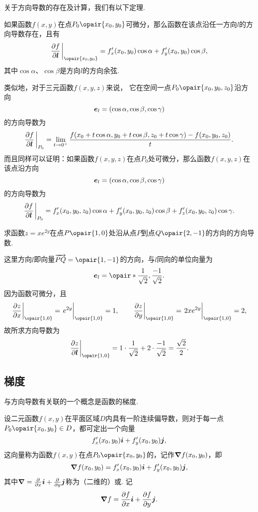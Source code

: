 关于方向导数的存在及计算，我们有以下定理.
\begin{theorem}[充分条件]
如果函数\(f(x,y)\)在点\(P_0\opair{x_0,y_0}\)可微分，那么函数在该点沿任一方向\(l\)的方向导数存在，且有\[
\pdv{f}{\mat{l}}\eval_{\opair{x_0,y_0}}
=f'_x(x_0,y_0) \cos\alpha + f'_y(x_0,y_0) \cos\beta,
\]其中\(\cos\alpha\)、\(\cos\beta\)是方向\(l\)的方向余弦.
\end{theorem}

类似地，对于三元函数\(f(x,y,z)\)来说，%
它在空间一点\(P_0\opair{x_0,y_0,z_0}\)沿方向\[
	\boldsymbol{e}_l = (\cos\alpha,\cos\beta,\cos\gamma)
\]的方向导数为\[
	\pdv{f}{\mat{l}}\eval_{P_0}
	= \lim\limits_{t\to0^+}
	\frac{f(x_0+t\cos\alpha,y_0+t\cos\beta,z_0+t\cos\gamma)-f(x_0,y_0,z_0)}{t}.
\]
而且同样可以证明：如果函数\(f(x,y,z)\)在点\(P_0\)处可微分，那么函数\(f(x,y,z)\)在该点沿方向\[
	\boldsymbol{e}_l = (\cos\alpha,\cos\beta,\cos\gamma)
\]的方向导数为\[
\pdv{f}{\mat{l}}\eval_{P_0}
= f'_x(x_0,y_0,z_0) \cos\alpha + f'_y(x_0,y_0,z_0) \cos\beta + f'_z(x_0,y_0,z_0) \cos\gamma.
\]

\begin{example}
求函数\(z = x e^{2y}\)在点\(P\opair{1,0}\)处沿从点\(P\)到点\(Q\opair{2,-1}\)的方向的方向导数.
\begin{solution}
这里方向\(l\)即向量\(\vec{PQ} = \opair{1,-1}\)的方向，与\(l\)同向的单位向量为\[
\mat{e}_l = \opair*{\frac{1}{\sqrt{2}},\frac{-1}{\sqrt{2}}}.
\]因为函数可微分，且\[
\eval{\pdv{z}{x}}_{\opair{1,0}}
= \eval{e^{2y}}_{\opair{1,0}}
= 1,
\qquad
\eval{\pdv{z}{y}}_{\opair{1,0}}
= \eval{2xe^{2y}}_{\opair{1,0}}
= 2,
\]故所求方向导数为\[
\eval{\pdv{z}{\mat{l}}}_{\opair{1,0}}
= 1 \cdot \frac{1}{\sqrt{2}} + 2 \cdot \frac{-1}{\sqrt{2}}
= \frac{\sqrt{2}}{2}.
\]
\end{solution}
\end{example}

\subsection{梯度}
与方向导数有关联的一个概念是函数的梯度.
\begin{definition}
设二元函数\(f(x,y)\)在平面区域\(D\)内具有一阶连续偏导数，则对于每一点\(P_0\opair{x_0,y_0} \in D\)，都可定出一个向量\[
f'_x(x_0,y_0) \boldsymbol{i} + f'_y(x_0,y_0) \boldsymbol{j},
\]这向量称为函数\(f(x,y)\)在点\(P_0\opair{x_0,y_0}\)的，记作\(\grad{f}(x_0,y_0)\)，即\[
\grad{f}(x_0,y_0)
= f'_x(x_0,y_0) \boldsymbol{i} + f'_y(x_0,y_0) \boldsymbol{j},
\]其中\(\grad = \pdv{x} \boldsymbol{i} + \pdv{y} \boldsymbol{j}\)称为（二维的）或.
记\[
\grad{f} = \pdv{f}{x} \boldsymbol{i} + \pdv{f}{y} \boldsymbol{j}.
\]
\end{definition}

